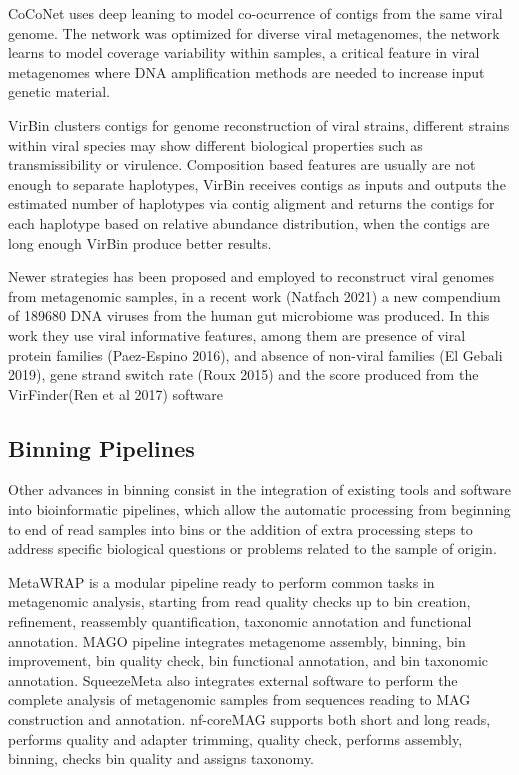 \documentclass{article}
\begin{document}
CoCoNet uses deep leaning to model co-ocurrence of contigs from the same viral genome. The network was optimized for diverse viral metagenomes, the network learns to model coverage variability within samples, a critical feature in viral metagenomes where DNA amplification methods are needed to increase input genetic material.

VirBin clusters contigs for genome reconstruction of viral strains, different strains within viral species may show different biological properties such as transmissibility or virulence. Composition based features are usually are not enough to separate haplotypes, VirBin receives contigs as inputs and outputs the estimated number of haplotypes via contig aligment and returns the contigs for each haplotype based on relative abundance distribution, when the contigs are long enough VirBin produce better results.

Newer strategies has been proposed and employed to reconstruct viral genomes from metagenomic samples, in a recent work (Natfach 2021) a new compendium of 189680 DNA viruses from the human gut microbiome was produced. In this work they use viral informative features, among them are presence of viral protein families (Paez-Espino 2016), and absence of non-viral families (El Gebali 2019), gene strand switch rate (Roux 2015) and the score produced from the VirFinder(Ren et al 2017) software  

\subsection{ Binning Pipelines}
Other advances in binning consist in the integration of existing tools and software into bioinformatic pipelines, which  allow the automatic processing from beginning to end of read samples into bins or the addition of extra processing steps to address specific biological questions or problems related to the sample of origin.


MetaWRAP is a modular pipeline ready to perform common tasks in metagenomic analysis, starting from read quality checks up to bin creation, refinement, reassembly quantification, taxonomic annotation and functional annotation.
MAGO pipeline integrates metagenome assembly, binning, bin improvement, bin quality check, bin functional annotation, and bin taxonomic annotation. 
SqueezeMeta also integrates external software to perform the complete analysis of metagenomic samples from sequences reading to MAG construction and annotation.%
nf-coreMAG supports both short and long reads, performs quality and adapter trimming, quality check,  performs assembly, binning, checks bin quality and assigns taxonomy.
\end{document}
